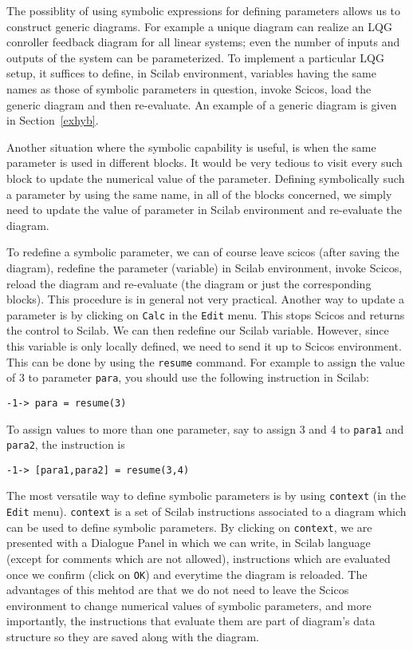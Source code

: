 \documentclass{book}
\begin{document}
The possiblity of using symbolic expressions for defining parameters
allows us to construct generic diagrams. For example a unique diagram 
can realize an LQG conroller feedback diagram for all linear systems; even the
number of inputs and outputs of the system can be parameterized. To implement a
particular LQG setup, it suffices to define, in Scilab environment, 
variables having the same names as those of symbolic parameters in question,
invoke Scicos, load the generic diagram and then re-evaluate. An
example of a generic diagram is given in Section~\ref{exhyb}.

\bigskip

Another situation where the symbolic capability is useful, is when the same
parameter is used in different blocks. It would be very tedious to 
visit every such block to update the numerical value of the parameter.
Defining symbolically such a parameter by using the same name, in all
of the blocks concerned, we simply need to update the value of parameter in Scilab
environment and re-evaluate the diagram.

\bigskip

To redefine a symbolic parameter, we can of course leave scicos (after
saving the diagram), redefine the parameter (variable) in Scilab environment, invoke
Scicos, reload the diagram and re-evaluate (the diagram or just the
corresponding blocks). This procedure is in general not very practical. Another
way to update a parameter is by clicking on {\tt Calc} in the {\tt Edit}
menu. This stops Scicos and returns the control to Scilab. We can then
redefine our Scilab variable. However, since this variable is only
locally defined, we need to send it up to Scicos environment. This can
be done by 
using the {\tt resume} command. For example to assign the value of 3
to parameter 
{\tt para}, you should use the following instruction in Scilab:
\begin{verbatim}
-1-> para = resume(3)
\end{verbatim}
To assign values to more than one parameter, say to assign 3 and 4 to
{\tt para1} and {\tt para2}, the instruction is
\begin{verbatim}
-1-> [para1,para2] = resume(3,4)
\end{verbatim}


\bigskip

The most versatile way to define symbolic parameters is by using {\tt context} (in the {\tt Edit}
menu). {\tt context} is a set of Scilab instructions associated to a 
diagram which can be used to define symbolic parameters. By clicking on 
{\tt context}, we are presented with a Dialogue Panel in which we can
write, in Scilab language (except for comments which are not allowed),
instructions which are evaluated once we confirm (click on {\tt OK})
and everytime the diagram is reloaded. The advantages of this mehtod are that 
we do not need to leave the Scicos environment to change numerical values of
symbolic parameters, and more importantly, the instructions that evaluate
them are part of diagram's data structure so they are saved along with the
diagram. 
\end{document}
